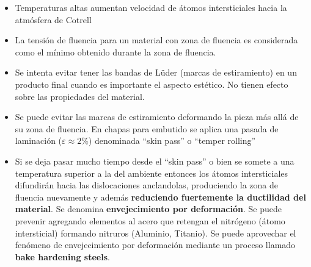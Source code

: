 \begin{itemize}
	\item Temperaturas altas aumentan velocidad de átomos intersticiales hacia la atmósfera de Cotrell
	\item La tensión de fluencia para un material con zona de fluencia es considerada como el mínimo obtenido durante la zona de fluencia.
	\item Se intenta evitar tener las bandas de Lüder (marcas de estiramiento) en un producto final cuando es importante el aspecto estético. No tienen efecto sobre las propiedades del material.
	\item Se puede evitar las marcas de estiramiento deformando  la pieza más allá de su zona de fluencia. En chapas para embutido se aplica una pasada de laminación ($\varepsilon \approx 2\%$) denominada  ``skin pass'' o  ``temper rolling''
	\item Si se deja pasar mucho tiempo desde el ``skin pass'' o bien se somete a una temperatura superior a la del ambiente entonces los átomos intersticiales difundirán hacia las dislocaciones anclandolas, produciendo la zona de fluencia nuevamente y además \textbf{reduciendo fuertemente la ductilidad del material}. Se denomina \textbf{envejecimiento por deformación}. Se puede prevenir agregando elementos al acero que retengan el nitrógeno (átomo intersticial) formando nitruros (Aluminio, Titanio). Se puede aprovechar el fenómeno de envejecimiento por deformación mediante un proceso llamado \textbf{bake hardening steels}.
\end{itemize}


